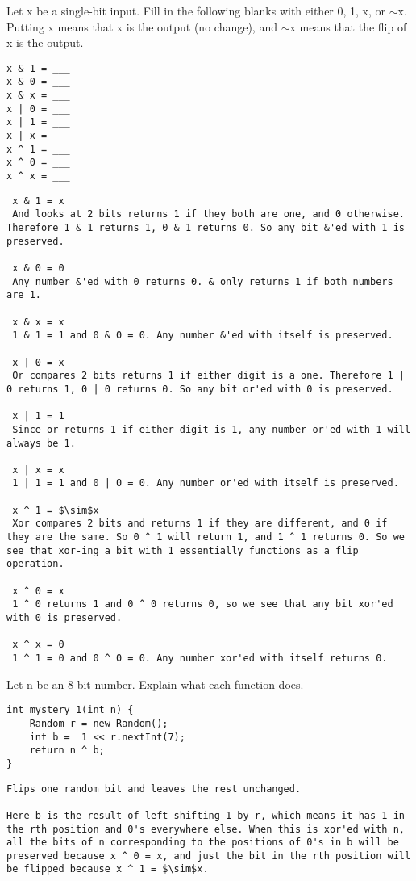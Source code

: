\question Let x be a single-bit input. Fill in the following blanks with either 0, 1, x, or $\sim$x. Putting x means that x is the output (no change), and $\sim$x means that the flip of x is the output.

\begin{lstlisting}
x & 1 = ___
x & 0 = ___ 
x & x = ___
x | 0 = ___ 
x | 1 = ___ 
x | x = ___
x ^ 1 = ___ 
x ^ 0 = ___ 
x ^ x = ___
\end{lstlisting}


\begin{solution}
\begin{lstlisting}
 x & 1 = x
 And looks at 2 bits returns 1 if they both are one, and 0 otherwise. Therefore 1 & 1 returns 1, 0 & 1 returns 0. So any bit &'ed with 1 is preserved.

 x & 0 = 0
 Any number &'ed with 0 returns 0. & only returns 1 if both numbers are 1.
 
 x & x = x
 1 & 1 = 1 and 0 & 0 = 0. Any number &'ed with itself is preserved.

 x | 0 = x
 Or compares 2 bits returns 1 if either digit is a one. Therefore 1 | 0 returns 1, 0 | 0 returns 0. So any bit or'ed with 0 is preserved. 

 x | 1 = 1
 Since or returns 1 if either digit is 1, any number or'ed with 1 will always be 1. 
 
 x | x = x
 1 | 1 = 1 and 0 | 0 = 0. Any number or'ed with itself is preserved.

 x ^ 1 = $\sim$x
 Xor compares 2 bits and returns 1 if they are different, and 0 if they are the same. So 0 ^ 1 will return 1, and 1 ^ 1 returns 0. So we see that xor-ing a bit with 1 essentially functions as a flip operation.

 x ^ 0 = x
 1 ^ 0 returns 1 and 0 ^ 0 returns 0, so we see that any bit xor'ed with 0 is preserved.
 
 x ^ x = 0
 1 ^ 1 = 0 and 0 ^ 0 = 0. Any number xor'ed with itself returns 0.
\end{lstlisting}
\end{solution}

\question Let n be an 8 bit number. Explain what each function does. 

\begin{lstlisting}
int mystery_1(int n) {
	Random r = new Random();
	int b =  1 << r.nextInt(7); 
	return n ^ b;
}
\end{lstlisting}
\begin{solution}
\begin{lstlisting}
Flips one random bit and leaves the rest unchanged.

Here b is the result of left shifting 1 by r, which means it has 1 in the rth position and 0's everywhere else. When this is xor'ed with n, all the bits of n corresponding to the positions of 0's in b will be preserved because x ^ 0 = x, and just the bit in the rth position will be flipped because x ^ 1 = $\sim$x.

\end{lstlisting}
\end{solution}

